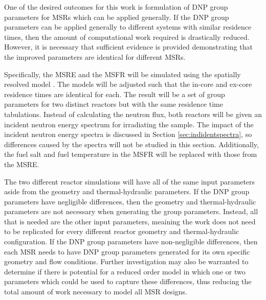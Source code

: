 One of the desired outcomes for this work is formulation of \gls{DNP} group parameters for \glspl{MSR} which can be applied generally.
If the \gls{DNP} group parameters can be applied generally to different systems with similar residence times, then the amount of computational work required is drastically reduced.
However, it is necessary that sufficient evidence is provided demonstrating that the improved parameters are identical for different \glspl{MSR}.

Specifically, the \gls{MSRE} and the \gls{MSFR} will be simulated using the spatially resolved model \cite{robertson1965msre, brovchenko2019neutronic}.
The models will be adjusted such that the in-core and ex-core residence times are identical for each.
The result will be a set of group parameters for two distinct reactors but with the same residence time tabulations.
Instead of calculating the neutron flux, both reactors will be given an incident neutron energy spectrum for irradiating the sample.
The impact of the incident neutron energy spectra is discussed in Section \ref{sec:indidentspectra}, so differences caused by the spectra will not be studied in this section.
Additionally, the fuel salt and fuel temperature in the \gls{MSFR} will be replaced with those from the \gls{MSRE}.

The two different reactor simulations will have all of the same input parameters aside from the geometry and thermal-hydraulic parameters.
If the \gls{DNP} group parameters have negligible differences, then the geometry and thermal-hydraulic parameters are not necessary when generating the group parameters.
Instead, all that is needed are the other input parameters, meaining the work does not need to be replicated for every different reactor geometry and thermal-hydraulic configuration.
If the \gls{DNP} group parameters have non-negligible differences, then each \gls{MSR} needs to have \gls{DNP} group parameters generated for its own specific geometry and flow conditions.
Further investigation may also be warranted to determine if there is potential for a reduced order model in which one or two parameters which could be used to capture these differences, thus reducing the total amount of work necessary to model all \gls{MSR} designs.
